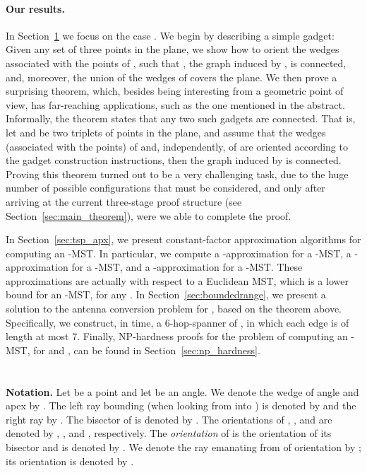 \documentclass[11pt]{article}
\begin{document}
\paragraph{Our results.}
In Section~\ref{sec:gadget} we focus on the case . We begin by describing a simple gadget: Given any set  of three points in the plane, we show how to orient the wedges associated with the points of , such that , the graph induced by , is connected, and, moreover, the union of the wedges of  covers the plane. We then prove a surprising theorem, which, besides being interesting from a geometric point of view, has far-reaching applications, such as the one mentioned in the abstract. Informally, the theorem states that any two such gadgets are connected. That is, let  and  be two triplets of points in the plane, and assume that the wedges (associated with the points) of  and, independently, of  are oriented according to the gadget construction instructions, then the graph induced by  is connected.
Proving this theorem turned out to be a very challenging task, due to the huge number of possible configurations that must be considered, and only after arriving at the current three-stage proof structure (see Section~\ref{sec:main_theorem}), were we able to complete the proof.


In Section~\ref{sec:tsp_apx}, we present constant-factor approximation algorithms for computing an -MST. In particular, we compute a -approximation for a -MST, a -approximation for a -MST, and a -approximation for a -MST. These approximations are actually with respect to a Euclidean MST, which is a lower bound for an -MST, for any .
In Section~\ref{sec:boundedrange}, we present a solution to the antenna conversion problem for , based on the theorem above. Specifically, we construct, in  time, a 6-hop-spanner of , in which each edge is of length at most 7.
Finally, NP-hardness proofs for the problem of computing an -MST, for  and , can be found in Section~\ref{sec:np_hardness}.

\section{}\label{sec:gadget}

{\bf Notation.}
Let  be a point and let  be an angle. We denote the wedge of angle  and apex  by . 
The left ray bounding  (when looking from  into ) is denoted by  and the right ray by . The bisector of  is denoted by .  
The orientations of , , and  are denoted by , , and , respectively.
The {\em orientation} of  is the orientation of its bisector and is denoted by
. We denote the ray emanating from  of orientation  by ; its orientation is denoted by . 
\end{document}
